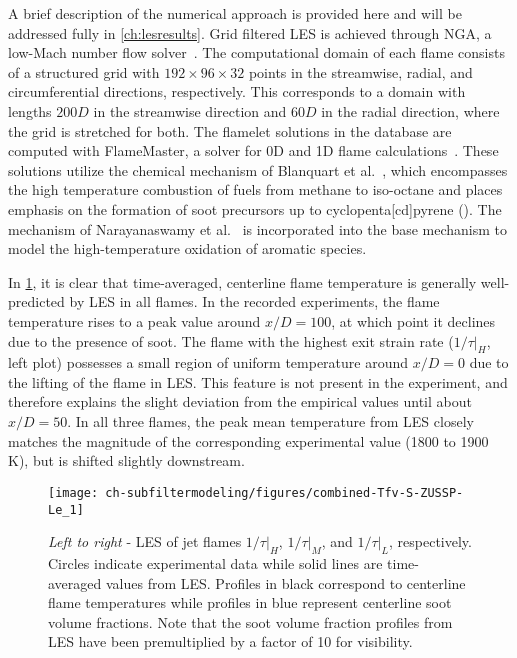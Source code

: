 A brief description of the numerical approach is provided here and will be addressed fully in \cref{ch:lesresults}. Grid filtered LES is achieved through NGA, a low-Mach number flow solver~\cite{desjardins2008}. The computational domain of each flame consists of a structured grid with $192 \times 96 \times 32$ points in the streamwise, radial, and circumferential directions, respectively. This corresponds to a domain with lengths $200D$ in the streamwise direction and $60D$ in the radial direction, where the grid is stretched for both. The flamelet solutions in the database are computed with FlameMaster, a solver for 0D and 1D flame calculations~\cite{flamemaster}. These solutions utilize the chemical mechanism of Blanquart et al.~\cite{blanquart2009588}, which encompasses the high temperature combustion of fuels from methane to iso-octane and places emphasis on the formation of soot precursors up to cyclopenta[cd]pyrene (). The mechanism of Narayanaswamy et al.~\cite{narayanaswamy2010} is incorporated into the base mechanism to model the high-temperature oxidation of aromatic species.

In \cref{fig:subfilter:leszussp:zusspleseval}, it is clear that time-averaged, centerline flame temperature is generally well-predicted by LES in all flames. In the recorded experiments, the flame temperature rises to a peak value around $x/D = 100$, at which point it declines due to the presence of soot. The flame with the highest exit strain rate ($1/\tau|_H$, left plot) possesses a small region of uniform temperature around $x/D = 0$ due to the lifting of the flame in LES. This feature is not present in the experiment, and therefore explains the slight deviation from the empirical values until about $x/D = 50$. In all three flames, the peak mean temperature from LES closely matches the magnitude of the corresponding experimental value (1800 to 1900 K), but is shifted slightly downstream.

\begin{figure}[htb]
  \begin{center}
    \texttt{[image: ch-subfiltermodeling/figures/combined-Tfv-S-ZUSSP-Le\_1]}
    \caption[LES Validation of Z-Uniform Soot Subfilter PDF]{\textit{Left to right} - LES of jet flames $1/\tau|_H$, $1/\tau|_M$, and $1/\tau|_L$, respectively. Circles indicate experimental data while solid lines are time-averaged values from LES. Profiles in black correspond to centerline flame temperatures while profiles in blue represent centerline soot volume fractions. Note that the soot volume fraction profiles from LES have been premultiplied by a factor of 10 for visibility.}
    \label{fig:subfilter:leszussp:zusspleseval}
  \end{center}
\end{figure}

